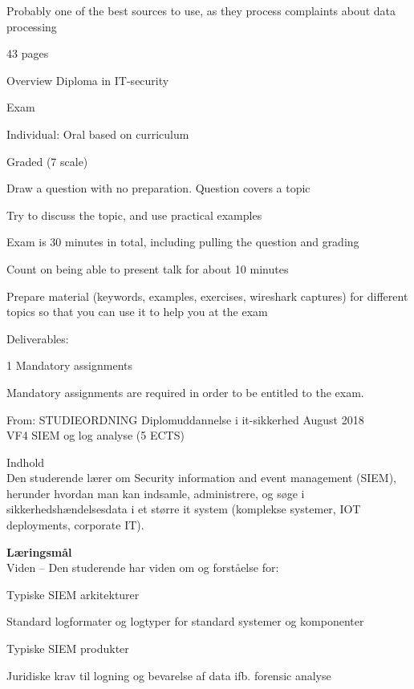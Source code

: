 \documentclass[Screen16to9,17pt]{foils}
\begin{document}
\begin{list2}
\item Probably one of the best sources to use, as they process complaints about data processing
\item 43 pages
\end{list2}






\hskip 7cm Overview Diploma in IT-security




\begin{list2}
\item Exam
\item Individual: Oral based on curriculum
\item Graded (7 scale)
\item Draw a question with no preparation. Question covers a topic
\item Try to discuss the topic, and use practical examples
\item Exam is 30 minutes in total, including pulling the question and grading
\item Count on being able to present talk for about 10 minutes
\item Prepare material (keywords, examples, exercises, wireshark captures) for different topics so that you can use it to help you at the exam

\vskip 5mm
\item Deliverables:
\item 1 Mandatory assignments
\item Mandatory assignments are required in order to be entitled to the exam.
\end{list2}





From: STUDIEORDNING Diplomuddannelse i it-sikkerhed August 2018\\
VF4 SIEM og log analyse (5 ECTS)

Indhold\\
Den studerende lærer om Security information and event management (SIEM), herunder
hvordan man kan indsamle, administrere, og søge i sikkerhedshændelsesdata i et større it
system (komplekse systemer, IOT deployments, corporate IT).

{\bf Læringsmål}\\
Viden -- Den studerende har viden om og forståelse for:
\begin{list2}
\item Typiske SIEM arkitekturer
\item Standard logformater og logtyper for standard systemer og komponenter
\item Typiske SIEM produkter
\item Juridiske krav til logning og bevarelse af data ifb. forensic analyse
\end{list2}
\end{document}
